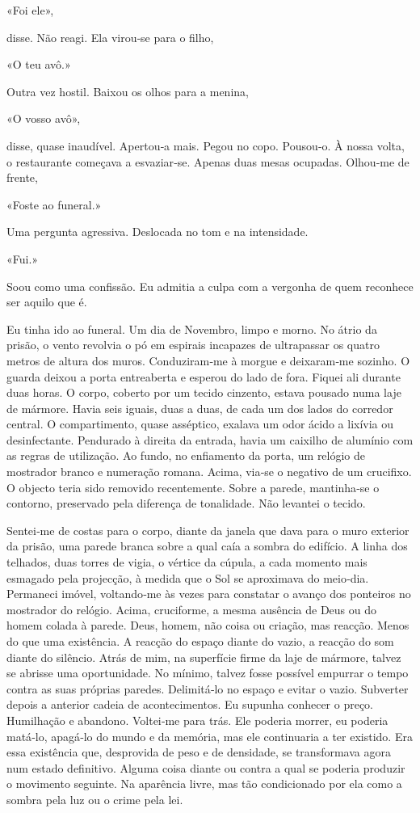 «Foi ele»,

disse. Não reagi. Ela virou­‑se para o filho,

«O teu avô.»

Outra vez hostil. Baixou os olhos para a menina,

«O vosso avô»,

disse, quase inaudível. Apertou­‑a mais. Pegou no copo. Pousou­‑o. À
nossa volta, o restaurante começava a esvaziar­‑se. Apenas duas mesas
ocupadas. Olhou­‑me de frente,

«Foste ao funeral.»

Uma pergunta agressiva. Deslocada no tom e na intensidade.

«Fui.»

Soou como uma confissão. Eu admitia a culpa com a vergonha de quem
reconhece ser aquilo que é.

Eu tinha ido ao funeral. Um dia de Novembro, limpo e morno. No átrio da
prisão, o vento revolvia o pó em espirais incapazes de ultrapassar os
quatro metros de altura dos muros. Conduziram­‑me à morgue e
deixaram­‑me sozinho. O guarda deixou a porta entreaberta e esperou do
lado de fora. Fiquei ali durante duas horas. O corpo, coberto por um
tecido cinzento, estava pousado numa laje de mármore. Havia seis iguais,
duas a duas, de cada um dos lados do corredor central. O compartimento,
quase asséptico, exalava um odor ácido a lixívia ou desinfectante.
Pendurado à direita da entrada, havia um caixilho de alumínio com as
regras de utilização. Ao fundo, no enfiamento da porta, um relógio de
mostrador branco e numeração romana. Acima, via­‑se o negativo de um
crucifixo. O objecto teria sido removido recentemente. Sobre a parede,
mantinha­‑se o contorno, preservado pela diferença de tonalidade. Não
levantei o tecido.

Sentei­‑me de costas para o corpo, diante da janela que dava para o muro
exterior da prisão, uma parede branca sobre a qual caía a sombra do
edifício. A linha dos telhados, duas torres de vigia, o vértice da
cúpula, a cada momento mais esmagado pela projecção, à medida que o Sol
se aproximava do meio­‑dia. Permaneci imóvel, voltando­‑me às vezes para
constatar o avanço dos ponteiros no mostrador do relógio. Acima,
cruciforme, a mesma ausência de Deus ou do homem colada à parede. Deus,
homem, não coisa ou criação, mas reacção. Menos do que uma existência. A
reacção do espaço diante do vazio, a reacção do som diante do silêncio.
Atrás de mim, na superfície firme da laje de mármore, talvez se abrisse
uma oportunidade. No mínimo, talvez fosse possível empurrar o tempo
contra as suas próprias paredes. Delimitá­‑lo no espaço e evitar o
vazio. Subverter depois a anterior cadeia de acontecimentos. Eu supunha
conhecer o preço. Humilhação e abandono. Voltei­‑me para trás. Ele
poderia morrer, eu poderia matá­‑lo, apagá­‑lo do mundo e da memória,
mas ele continuaria a ter existido. Era essa existência que, desprovida
de peso e de densidade, se transformava agora num estado definitivo.
Alguma coisa diante ou contra a qual se poderia produzir o movimento
seguinte. Na aparência livre, mas tão condicionado por ela como a sombra
pela luz ou o crime pela lei.

